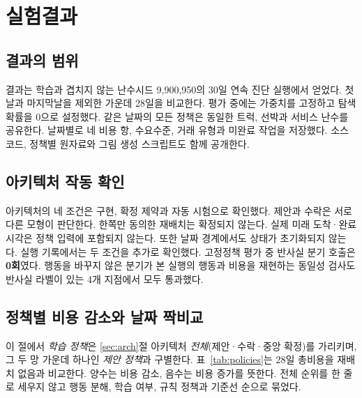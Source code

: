 \section{실험결과}
\label{sec:exp}

\subsection{결과의 범위}
\label{sec:exp-scope}
결과는 학습과 겹치지 않는 난수시드 9,900,950의 30일 연속 진단 실행에서 얻었다. 첫날과
마지막날을 제외한 가운데 28일을 비교한다. 평가 중에는 가중치를 고정하고 탐색확률을
0으로 설정했다. 같은 날짜의 모든 정책은 동일한 트럭, 선박과 서비스 난수를 공유한다.
날짜별로 네 비용 항, 수요수준, 거래 유형과 미완료 작업을 저장했다. 소스코드, 정책별
원자료와 그림 생성 스크립트도 함께 공개한다.

\subsection{아키텍처 작동 확인}
\label{sec:exp-confirm}
아키텍처의 네 조건은 구현, 확정 제약과 자동 시험으로 확인했다. 제안과 수락은 서로
다른 모형이 판단한다. 한쪽만 동의한 재배치는 확정되지 않는다. 실제 미래 도착·완료시각은
정책 입력에 포함되지 않는다. 또한 날짜 경계에서도 상태가 초기화되지 않는다. 실행
기록에서는 두 조건을 추가로 확인했다. 고정정책 평가 중 반사실 분기 호출은
\textbf{0회}였다. 행동을 바꾸지 않은 분기가 본 실행의 행동과 비용을 재현하는 동일성
검사도 반사실 라벨이 있는 4개 지점에서 모두 통과했다.

\subsection{정책별 비용 감소와 날짜 짝비교}
\label{sec:exp-paired}
이 절에서 \emph{학습 정책}은 \ref{sec:arch}절 아키텍처 \emph{전체}(제안·수락·중앙
확정)를 가리키며, 그 두 망 가운데 하나인 \emph{제안 정책}과 구별한다.
표~\ref{tab:policies}는 28일 총비용을 재배치 없음과 비교한다. 양수는 비용 감소,
음수는 비용 증가를 뜻한다. 전체 순위를 한 줄로 세우지 않고 행동 분해, 학습 여부,
규칙 정책과 기준선 순으로 묶었다.

